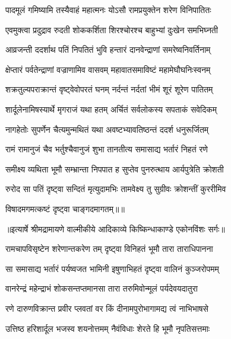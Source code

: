 \twolineshloka
{पादमूलं गमिष्यामि तस्यैवाहं महात्मनः}
{योऽसौ रामप्रयुक्तेन शरेण विनिपातितः} %

\twolineshloka
{एवमुक्त्वा प्रदुद्राव रुदती शोककर्शिता}
{शिरश्चोरश्च बाहुभ्यां दुःखेन समभिघ्नती} %

\twolineshloka
{आव्रजन्ती ददर्शाथ पतिं निपतितं भुवि}
{हन्तारं दानवेन्द्राणां समरेष्वनिवर्तिनाम्} %

\twolineshloka
{क्षेप्तारं पर्वतेन्द्राणां वज्राणामिव वासवम्}
{महावातसमाविष्टं महामेघौघनिःस्वनम्} %

\twolineshloka
{शक्रतुल्यपराक्रान्तं वृष्ट्वेवोपरतं घनम्}
{नर्दन्तं नर्दतां भीमं शूरं शूरेण पातितम्} %

\twolineshloka
{शार्दूलेनामिषस्यार्थे मृगराजं यथा हतम्}
{अर्चितं सर्वलोकस्य सपताकं सवेदिकम्} %

\twolineshloka
{नागहेतोः सुपर्णेन चैत्यमुन्मथितं यथा}
{अवष्टभ्यावतिष्ठन्तं ददर्श धनुरूर्जितम्} %

\twolineshloka
{रामं रामानुजं चैव भर्तुश्चैवानुजं शुभा}
{तानतीत्य समासाद्य भर्तारं निहतं रणे} %

\twolineshloka
{समीक्ष्य व्यथिता भूमौ सम्भ्रान्ता निपपात ह}
{सुप्तेव पुनरुत्थाय आर्यपुत्रेति क्रोशती} %

\twolineshloka
{रुरोद सा पतिं दृष्ट्वा सन्दितं मृत्युदामभिः}
{तामवेक्ष्य तु सुग्रीवः क्रोशन्तीं कुररीमिव} %

{विषादमगमत्कष्टं दृष्ट्वा चाङ्गदमागतम्॥॥} %

\addtocounter{shlokacount}{1}


{॥इत्यार्षे श्रीमद्रामायणे वाल्मीकीये आदिकाव्ये किष्किन्धाकाण्डे एकोनविंशः सर्गः॥}


\twolineshloka
{रामचापविसृष्टेन शरेणान्तकरेण तम्}
{दृष्ट्वा विनिहतं भूमौ तारा ताराधिपानना} %

\twolineshloka
{सा समासाद्य भर्तारं पर्यष्वजत भामिनी}
{इषुणाभिहतं दृष्ट्वा वालिनं कुञ्जरोपमम्} %

\twolineshloka
{वानरेन्द्रं महेन्द्राभं शोकसन्तप्तमानसा}
{तारा तरुमिवोन्मूलं पर्यदेवयदातुरा} %

\twolineshloka
{रणे दारुणविक्रान्त प्रवीर प्लवतां वर}
{किं दीनामपुरोभागामद्य त्वं नाभिभाषसे} %

\twolineshloka
{उत्तिष्ठ हरिशार्दूल भजस्व शयनोत्तमम्}
{नैवंविधाः शेरते हि भूमौ नृपतिसत्तमाः} %

